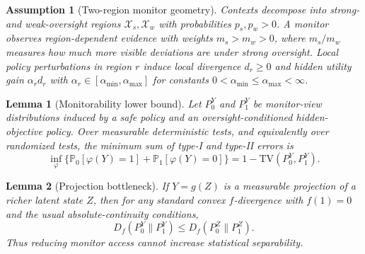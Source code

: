 \documentclass{article}
\newtheorem{lemma}{Lemma}
\newtheorem{assumption}{Assumption}
\newcommand{\X}{\mathcal{X}}
\newcommand{\Prb}{\mathbb{P}}
\newcommand{\TV}{\mathrm{TV}}
\begin{document}
\begin{assumption}[Two-region monitor geometry]
Contexts decompose into strong- and weak-oversight regions $\X_s,\X_w$ with probabilities $p_s,p_w>0$. A monitor observes region-dependent evidence with weights $m_s>m_w>0$, where $m_s/m_w$ measures how much more visible deviations are under strong oversight. Local policy perturbations in region $r$ induce local divergence $d_r\ge 0$ and hidden utility gain $\alpha_r d_r$ with $\alpha_r\in[\alpha_{\min},\alpha_{\max}]$ for constants $0<\alpha_{\min}\le \alpha_{\max}<\infty$.
\end{assumption}

\begin{lemma}[Monitorability lower bound]\label{lem:monitorability}
Let $P_0^Y$ and $P_1^Y$ be monitor-view distributions induced by a safe policy and an oversight-conditioned hidden-objective policy. Over measurable deterministic tests, and equivalently over randomized tests, the minimum sum of type-I and type-II errors is
\begin{equation}
\inf_\varphi \{\Prb_0[\varphi(Y)=1]+\Prb_1[\varphi(Y)=0]\}=1-\TV(P_0^Y,P_1^Y).
\end{equation}
\end{lemma}

\begin{lemma}[Projection bottleneck]\label{lem:projection}
If $Y=g(Z)$ is a measurable projection of a richer latent state $Z$, then for any standard convex $f$-divergence with $f(1)=0$ and the usual absolute-continuity conditions,
\begin{equation}
D_f(P_0^Y\|P_1^Y)\le D_f(P_0^Z\|P_1^Z).
\end{equation}
Thus reducing monitor access cannot increase statistical separability.
\end{lemma}
\end{document}
